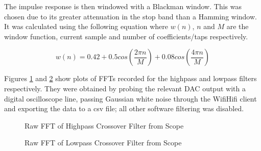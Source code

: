 \documentclass[main.tex]{subfiles}
\begin{document}
\medskip
The impulse response is then windowed with a Blackman window.
This was chosen due to its greater attenuation in the stop band than a Hamming window\cite{DSP-berndporr}.
It was calculated using the following equation where $w(n)$, $n$ and $M$ are the window function, current sample and number of coefficients/taps respectively.

\begin{equation}
    w(n)=
    0.42 + 0.5cos\left(\frac{2\pi n}{M}\right) + 0.08cos\left(\frac{4\pi n}{M}\right)
\end{equation}

Figures \ref{fig:highpass-fft} and \ref{fig:lowpass-fft} show plots of FFTs recorded for the highpass and lowpass filters respectively.
They were obtained by probing the relevant DAC output with a digital oscilloscope line, passing Gaussian white noise through the WifiHifi client and exporting the data to a csv file;
all other software filtering was disabled.

\def \minfft{0}
\def \maxfft{15000}

\begin{figure}[H]
    \caption{Raw FFT of Highpass Crossover Filter from Scope}
    \label{fig:highpass-fft}
\end{figure}

\begin{figure}[H]
    \caption{Raw FFT of Lowpass Crossover Filter from Scope}
    \label{fig:lowpass-fft}
\end{figure}
\end{document}
